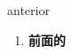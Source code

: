
\begin{frame}
{\huge anterior}
\begin{center}
\begin{enumerate}\Large
  \item \textbf{前面的}
\end{enumerate}
\end{center}
\end{frame}

